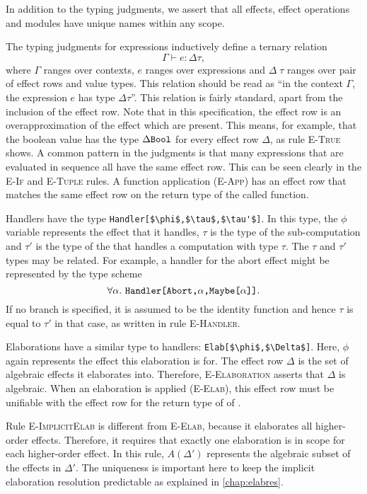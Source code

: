 In addition to the typing judgments, we assert that all effects, effect operations and modules have unique names within any scope.

The typing judgments for expressions inductively define a ternary relation
\[ \Gamma \vdash e : \Delta\tau, \]
where $\Gamma$ ranges over contexts, $e$ ranges over expressions and $\Delta\;\tau$ ranges over pair of effect rows and value types. This relation should be read as ``in the context $\Gamma$, the expression $e$ has type $\Delta\tau$''. This relation is fairly standard, apart from the inclusion of the effect row. Note that in this specification, the effect row is an overapproximation of the effect which are present. This means, for example, that the boolean value  has the type $\Delta\text{\texttt{Bool}}$ for every effect row $\Delta$, as rule \textsc{E-True} shows. A common pattern in the judgments is that many expressions that are evaluated in sequence all have the same effect row. This can be seen clearly in the \textsc{E-If} and \textsc{E-Tuple} rules. A function application (\textsc{E-App}) has an effect row that matches the same effect row on the return type of the called function. 

Handlers have the type \lstinline[mathescape]{Handler[$\phi$,$\tau$,$\tau'$]}. In this type, the $\phi$ variable represents the effect that it handles, $\tau$ is the type of the sub-computation and $\tau'$ is the type of the  that handles a computation with type $\tau$. The $\tau$ and $\tau'$ types may be related. For example, a handler for the abort effect might be represented by the type scheme
\[ \forall \alpha.\ \text{\texttt{Handler[Abort,}}\alpha\text{\texttt{,Maybe[}}\alpha\text{\texttt{]]}}. \]
If no  branch is specified, it is assumed to be the identity function and hence $\tau$ is equal to $\tau'$ in that case, as written in rule \textsc{E-Handler}.

Elaborations have a similar type to handlers: \lstinline[mathescape]{Elab[$\phi$,$\Delta$]}. Here, $\phi$ again represents the effect this elaboration is for. The effect row $\Delta$ is the set of algebraic effects it elaborates into. Therefore, \textsc{E-Elaboration} asserts that $\Delta$ is algebraic. When an elaboration is applied (\textsc{E-Elab}), this effect row must be unifiable with the effect row for the return type of of .

Rule \textsc{E-ImplicitElab} is different from \textsc{E-Elab}, because it elaborates all higher-order effects. Therefore, it requires that exactly one elaboration is in scope for each higher-order effect. In this rule, $A(\Delta')$ represents the algebraic subset of the effects in $\Delta'$. The uniqueness is important here to keep the implicit elaboration resolution predictable as explained in \cref{chap:elabres}.

